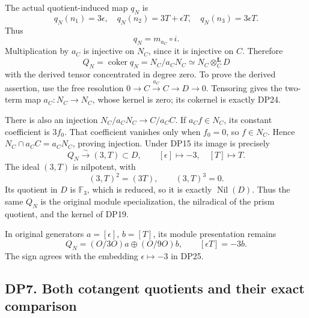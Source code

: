 \documentclass[
  10pt,
  a4paper,
]{article}
\begin{document}
The actual quotient-induced map \(q_N\) is \[
q_N(n_1)=3\epsilon,\quad
q_N(n_2)=3T+\epsilon T,\quad
q_N(n_3)=3\epsilon T.
\] Thus \[
\boxed{q_N=m_{a_C}\circ i.}
\tag{DP23}
\] Multiplication by \(a_C\) is injective on \(N_C\), since it is
injective on \(C\). Therefore \[
Q_N=\operatorname{coker}q_N
=N_C/a_CN_C
\simeq N_C\otimes_C^{\mathbf L}D
\tag{DP24}
\] with the derived tensor concentrated in degree zero. To prove the
derived assertion, use the free resolution
\(0\to C\xrightarrow{a_C}C\to D\to0\). Tensoring gives the two-term map
\(a_C:N_C\to N_C\), whose kernel is zero; its cokernel is exactly DP24.

There is also an injection \(N_C/a_CN_C\to C/a_CC\). If
\(a_C f\in N_C\), its constant coefficient is \(3f_0\). That coefficient
vanishes only when \(f_0=0\), so \(f\in N_C\). Hence
\(N_C\cap a_CC=a_CN_C\), proving injection. Under DP15 its image is
precisely \[
\boxed{Q_N\xrightarrow{\sim}(3,T)\subset D,\qquad
[\epsilon]\mapsto-3,\quad[T]\mapsto T.}
\tag{DP25}
\] The ideal \((3,T)\) is nilpotent, with \[
(3,T)^2=(3T),\qquad(3,T)^3=0.
\] Its quotient in \(D\) is \(\mathbb F_3\), which is reduced, so it is
exactly \(\operatorname{Nil}(D)\). Thus the same \(Q_N\) is the original
module specialization, the nilradical of the prism quotient, and the
kernel of DP19.

In original generators \(a=[\epsilon]\), \(b=[T]\), its module
presentation remains \[
Q_N=(O/3O)a\oplus(O/9O)b,\qquad[\epsilon T]=-3b.
\tag{DP26}
\] The sign agrees with the embedding \(\epsilon\mapsto-3\) in DP25.

\subsection{DP7. Both cotangent quotients and their exact
comparison}\label{dp7.-both-cotangent-quotients-and-their-exact-comparison}
\end{document}
